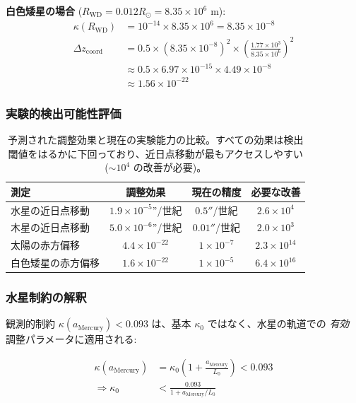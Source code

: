 \documentclass[11pt,a4paper]{article}
\begin{document}
	\textbf{白色矮星の場合} ($R_{\text{WD}} = 0.012 R_\odot = 8.35 \times 10^6$ m):
	\begin{align}
		\kappa(R_{\text{WD}}) &= 10^{-14} \times 8.35 \times 10^6 = 8.35 \times 10^{-8} \\
		\Delta z_{\text{coord}} &= 0.5 \times (8.35 \times 10^{-8})^2 \times \left(\frac{1.77 \times 10^3}{8.35 \times 10^6}\right)^2 \\
		&\approx 0.5 \times 6.97 \times 10^{-15} \times 4.49 \times 10^{-8} \\
		&\approx 1.56 \times 10^{-22}
	\end{align}
	
	\subsubsection{実験的検出可能性評価}
	
	\begin{table}[htbp]
		\centering
	
			\begin{tabular}{lccc}
				\toprule
				\textbf{測定} & \textbf{調整効果} & \textbf{現在の精度} & \textbf{必要な改善} \\
				\midrule
				水星の近日点移動 & $1.9 \times 10^{-5}$''/世紀 & $0.5''$/世紀 & $2.6 \times 10^4$ \\
				木星の近日点移動 & $5.0 \times 10^{-6}$''/世紀 & $0.01''$/世紀 & $2.0 \times 10^3$ \\
				太陽の赤方偏移 & $4.4 \times 10^{-22}$ & $1 \times 10^{-7}$ & $2.3 \times 10^{14}$ \\
				白色矮星の赤方偏移 & $1.6 \times 10^{-22}$ & $1 \times 10^{-5}$ & $6.4 \times 10^{16}$ \\
				\bottomrule
			\end{tabular}
	
		\caption{予測された調整効果と現在の実験能力の比較。すべての効果は検出閾値をはるかに下回っており、近日点移動が最もアクセスしやすい ($\sim 10^4$ の改善が必要)。}
	\end{table}
	
	\subsubsection{水星制約の解釈}
	
	観測的制約 $\kappa(a_{\text{Mercury}}) < 0.093$ は、基本 $\kappa_0$ ではなく、水星の軌道での \textit{有効} 調整パラメータに適用される:
	
	\begin{align}
		\kappa(a_{\text{Mercury}}) &= \kappa_0 \left(1 + \frac{a_{\text{Mercury}}}{L_0}\right) < 0.093 \\
		\Rightarrow \kappa_0 &< \frac{0.093}{1 + a_{\text{Mercury}}/L_0}
	\end{align}
	
\end{document}
